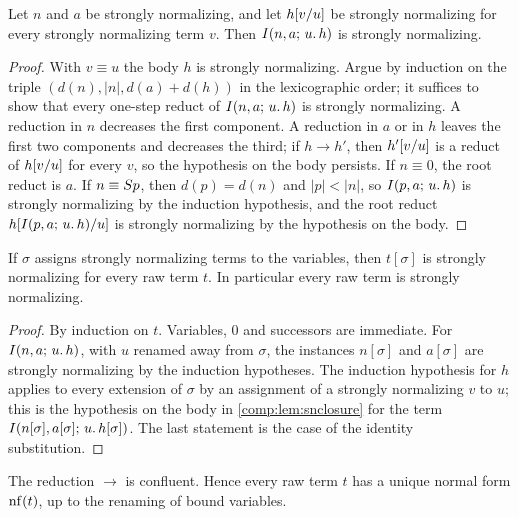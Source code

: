 \begin{lemma}
\label{comp:lem:snclosure}
Let $n$ and $a$ be strongly normalizing, and let $h[v/u]$ be strongly
normalizing for every strongly normalizing term $v$. Then $I(n,a;\,u.\,h)$
is strongly normalizing.
\end{lemma}

\begin{proof}
With $v\equiv u$ the body $h$ is strongly normalizing. Argue by induction on
the triple $(d(n),|n|,d(a)+d(h))$ in the lexicographic order; it suffices to
show that every one-step reduct of $I(n,a;\,u.\,h)$ is strongly
normalizing. A reduction in $n$ decreases the first component. A reduction
in $a$ or in $h$ leaves the first two components and decreases the third;
if $h\to h'$, then $h'[v/u]$ is a reduct of $h[v/u]$ for every
$v$, so the hypothesis on the body persists. If $n\equiv0$, the root reduct
is $a$. If $n\equiv S p$, then $d(p)=d(n)$ and $|p|<|n|$, so
$I(p,a;\,u.\,h)$ is strongly normalizing by the induction hypothesis, and
the root reduct $h[I(p,a;\,u.\,h)/u]$ is strongly normalizing by
the hypothesis on the body.
\end{proof}

\begin{theorem}
\label{comp:thm:sn}
If $\sigma$ assigns strongly normalizing terms to the variables, then
$t[\sigma]$ is strongly normalizing for every raw term $t$. In particular
every raw term is strongly normalizing.
\end{theorem}

\begin{proof}
By induction on $t$. Variables, $0$ and successors are immediate. For
$I(n,a;\,u.\,h)$, with $u$ renamed away from $\sigma$, the instances
$n[\sigma]$ and $a[\sigma]$ are strongly normalizing by the induction
hypotheses. The induction hypothesis for $h$ applies to every extension of
$\sigma$ by an assignment of a strongly normalizing $v$ to $u$; this is the
hypothesis on the body in \cref{comp:lem:snclosure} for the term
$I(n[\sigma],a[\sigma];\,u.\,h[\sigma])$. The last statement is the case
of the identity substitution.
\end{proof}

\begin{theorem}[Confluence]
\label{comp:thm:confluence}
The reduction $\to$ is confluent. Hence every raw term $t$ has a unique
normal form $\operatorname{nf}(t)$, up to the renaming of bound variables.
\end{theorem}

